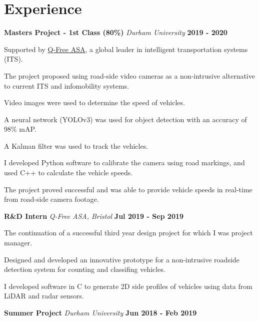 \documentclass[a4paper, 11pt, hidelinks]{article}
\newcommand{\xp}[3]{
	\vspace{0.25em}
	\textbf{\large#1} \quad \emph{\large#2} \hfill \textbf{\large#3}
}
\begin{document}
	\begin{minipage}{0.587\textwidth}
		\vspace{-0.25em}
		
		\section{Experience}
		\xp{Masters Project - 1st Class (80\%)}{Durham University}{2019 - 2020}
		\begin{itemise}
			\item Supported by \href{https://www.q-free.com/}{Q-Free ASA}, a global leader in intelligent transportation systems (ITS).
			\item The project proposed using road-side video cameras as a non-intrusive alternative to current ITS and infomobility systems.
			\item Video images were used to determine the speed of vehicles.
			\item A neural network (YOLOv3) was used for object detection with an accuracy of 98\% mAP.
			\item A Kalman filter was used to track the vehicles.
			\item I developed Python software to calibrate the camera using road markings, and used C++ to calculate the vehicle speeds.
			\item The project proved successful and was able to provide vehicle speeds in real-time from road-side camera footage.
			\hfill
			\href{https://www.francisgurr.com/pages/masters_project/masters_project.html}{\faExternalLink}
		\end{itemise}
		\xp{R\&D Intern}{Q-Free ASA, Bristol}{Jul 2019 - Sep 2019}
		\begin{itemise}
			\item The continuation of a successful third year design project for which I was project manager.
			\item Designed and developed an innovative prototype for a non-intrusive roadside detection system for counting and classifing vehicles.
			\item I developed software in C to generate 2D side profiles of vehicles using data from LiDAR and radar sensors.
			\hfill
			\href{https://www.francisgurr.com/pages/qfree_internship/qfree_internship.html}{\faExternalLink}
		\end{itemise}
		\xp{Summer Project}{Durham University}{Jun 2018 - Feb 2019}
		\begin{itemise}

\end{itemise}
\end{minipage}
\end{document}

